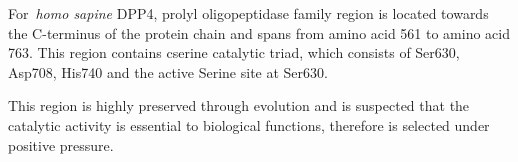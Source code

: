 For~\textit{homo sapine} DPP4, prolyl oligopeptidase family region is located towards the C-terminus of the protein chain and spans from amino acid 561 to amino acid 763. This region contains cserine catalytic triad, which consists of Ser630, Asp708, His740 and the active Serine site at Ser630. \par
This region is highly preserved through evolution and is suspected that the catalytic activity is essential to biological functions, therefore is selected under positive pressure. 